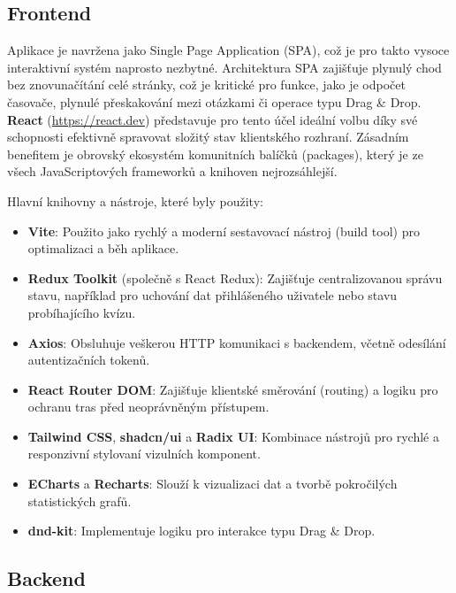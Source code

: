 \documentclass{vskpou} %
\begin{document}
\subsection{Frontend}

Aplikace je navržena jako Single Page Application (SPA), což je pro takto vysoce interaktivní systém naprosto nezbytné. Architektura SPA zajišťuje plynulý chod bez znovunačítání celé stránky, což je kritické pro funkce, jako je odpočet časovače, plynulé přeskakování mezi otázkami či operace typu Drag \& Drop. \textbf{React} (\url{https://react.dev})\cite{react_components} představuje pro tento účel ideální volbu díky své schopnosti efektivně spravovat složitý stav klientského rozhraní. Zásadním benefitem je obrovský ekosystém komunitních balíčků (packages), který je ze všech JavaScriptových frameworků a knihoven nejrozsáhlejší.

Hlavní knihovny a nástroje, které byly použity:

\begin{itemize}
    \item \textbf{Vite}: Použito jako rychlý a moderní sestavovací nástroj (build tool) pro optimalizaci a běh aplikace.
    \item \textbf{Redux Toolkit} (společně s React Redux): Zajišťuje centralizovanou správu stavu, například pro uchování dat přihlášeného uživatele nebo stavu probíhajícího kvízu\cite{redux_toolkit}.
    \item \textbf{Axios}: Obsluhuje veškerou HTTP komunikaci s backendem, včetně odesílání autentizačních tokenů\cite{axios}.
    \item \textbf{React Router DOM}: Zajišťuje klientské směrování (routing) a logiku pro ochranu tras před neoprávněným přístupem\cite{react_router}.
    \item \textbf{Tailwind CSS}, \textbf{shadcn/ui} a \textbf{Radix UI}: Kombinace nástrojů pro rychlé a responzivní stylovaní vizulních komponent\cite{shadcn_ui,radix_ui}.
    \item \textbf{ECharts} a \textbf{Recharts}: Slouží k vizualizaci dat a tvorbě pokročilých statistických grafů\cite{echarts,recharts,healy2019}.
    \item \textbf{dnd-kit}: Implementuje logiku pro interakce typu Drag \& Drop\cite{dnd_kit,html_dnd}.
\end{itemize}

\subsection{Backend}
\end{document}
